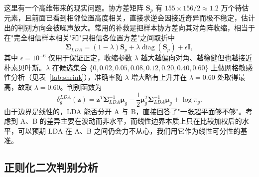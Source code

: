 \documentclass[12pt,a4paper]{article}
\begin{document}
这里有一个高维带来的现实问题。协方差矩阵 $\mathbf{S}_p$ 有 $155\times156/2\approx1.2$ 万个待估元素，且前面已看到相邻位置高度相关，直接求逆会因接近奇异而极不稳定，估计出的判别方向会被噪声放大。常用的补救是把样本协方差向其对角阵收缩，相当于在"完全相信样本相关"和"只相信各位置方差"之间取折中
\begin{equation}
\boldsymbol{\Sigma}_{LDA}=(1-\lambda)\mathbf{S}_p+\lambda\operatorname{diag}(\mathbf{S}_p)+\epsilon\mathbf{I},
\end{equation}
其中 $\epsilon=10^{-6}$ 仅用于保证正定，收缩参数 $\lambda$ 越大越偏向对角、越稳健但也越接近朴素贝叶斯。$\lambda$ 在候选集合 $\{0,0.02,0.05,0.08,0.12,0.20,0.40,0.60\}$ 上做网格敏感性分析（见表~\ref{tab:shrink}），准确率随 $\lambda$ 增大略有上升并在 $\lambda=0.60$ 处取得最高，故取 $\lambda=0.60$。判别函数为
\begin{equation}
\delta_g^{LDA}(\mathbf{z})=\mathbf{z}^{T}\boldsymbol{\Sigma}_{LDA}^{-1}\boldsymbol{\mu}_g
-\frac{1}{2}\boldsymbol{\mu}_g^{T}\boldsymbol{\Sigma}_{LDA}^{-1}\boldsymbol{\mu}_g+\log\pi_g.
\end{equation}
由于边界是线性的，LDA 能否分开 A 与 B，直接回答了"一张超平面够不够"。考虑到 A、B 的差异主要在波动而非水平，而线性边界本质上只在比较加权后的水平，可以预期 LDA 在 A、B 之间仍会力不从心，我们用它作为线性可分性的基准。

\subsection{正则化二次判别分析}
\end{document}
